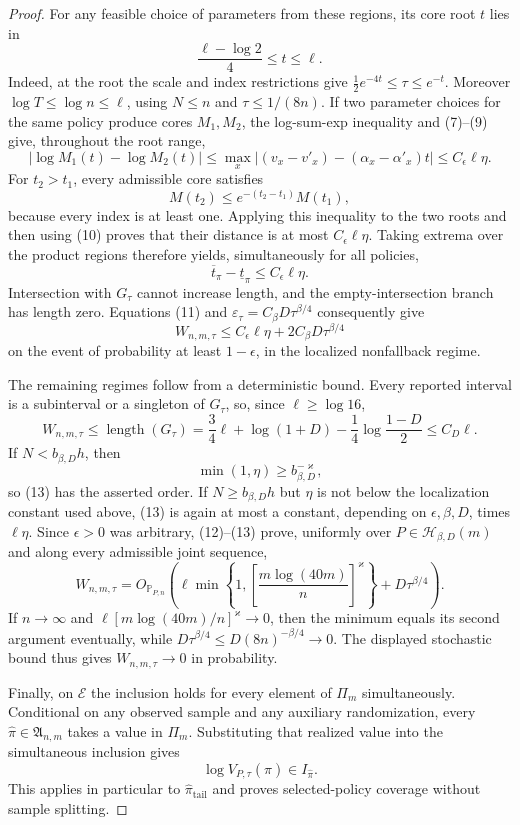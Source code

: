 \documentclass{article}
\begin{document}
\begin{proof}
For any feasible choice of parameters from these regions, its core root \(t\) lies in
\[
 \frac{\ell-\log2}{4}\leq t\leq\ell.
 \tag{9}
\]
Indeed, at the root the scale and index restrictions give
\(\tfrac12e^{-4t}\leq\tau\leq e^{-t}\).  Moreover
\(\log T\leq\log n\leq\ell\), using \(N\leq n\) and \(\tau\leq1/(8n)\).  If two parameter choices for the same policy produce cores \(M_1,M_2\), the log-sum-exp inequality and (7)--(9) give, throughout the root range,
\[
 |\log M_1(t)-\log M_2(t)|
 \leq\max_x\left|(v_x-v'_x)-(\alpha_x-\alpha'_x)t\right|
 \leq C_\epsilon\ell\eta.
 \tag{10}
\]
For \(t_2>t_1\), every admissible core satisfies
\[
 M(t_2)\leq e^{-(t_2-t_1)}M(t_1),
\]
because every index is at least one.  Applying this inequality to the two roots and then using (10) proves that their distance is at most \(C_\epsilon\ell\eta\).  Taking extrema over the product regions therefore yields, simultaneously for all policies,
\[
 \overline t_\pi-\underline t_\pi\leq C_\epsilon\ell\eta.
 \tag{11}
\]
Intersection with \(G_\tau\) cannot increase length, and the empty-intersection branch has length zero.  Equations (11) and \(\varepsilon_\tau=C_\beta D\tau^{\beta/4}\) consequently give
\[
 W_{n,m,\tau}
 \leq C_\epsilon\ell\eta+2C_\beta D\tau^{\beta/4}
 \tag{12}
\]
on the event of probability at least \(1-\epsilon\), in the localized nonfallback regime.

The remaining regimes follow from a deterministic bound.  Every reported interval is a subinterval or a singleton of \(G_\tau\), so, since \(\ell\geq\log16\),
\[
 W_{n,m,\tau}\leq\operatorname{length}(G_\tau)
 =\frac34\ell+\log(1+D)-\frac14\log\frac{1-D}{2}
 \leq C_D\ell.
 \tag{13}
\]
If \(N<b_{\beta,D}h\), then
\[
 \min(1,\eta)\geq b_{\beta,D}^{-\varkappa},
\]
so (13) has the asserted order.  If \(N\geq b_{\beta,D}h\) but \(\eta\) is not below the localization constant used above, (13) is again at most a constant, depending on \(\epsilon,\beta,D\), times \(\ell\eta\).  Since \(\epsilon>0\) was arbitrary, (12)--(13) prove, uniformly over \(P\in\mathcal H_{\beta,D}(m)\) and along every admissible joint sequence,
\[
 W_{n,m,\tau}
 =O_{\mathbb P_{P,n}}\!\left(
 \ell\min\left\{1,\left[\frac{m\log(40m)}n\right]^{\varkappa}\right\}
 +D\tau^{\beta/4}\right).
\]
If \(n\to\infty\) and \(\ell[m\log(40m)/n]^{\varkappa}\to0\), then the minimum equals its second argument eventually, while \(D\tau^{\beta/4}\leq D(8n)^{-\beta/4}\to0\).  The displayed stochastic bound thus gives \(W_{n,m,\tau}\to0\) in probability.

Finally, on \(\mathcal E\) the inclusion holds for every element of \(\Pi_m\) simultaneously.  Conditional on any observed sample and any auxiliary randomization, every \(\widehat\pi\in\mathfrak A_{n,m}\) takes a value in \(\Pi_m\).  Substituting that realized value into the simultaneous inclusion gives
\[
 \log V_{P,\tau}(\widehat\pi)\in I_{\widehat\pi}.
\]
This applies in particular to \(\widehat\pi_{\mathrm{tail}}\) and proves selected-policy coverage without sample splitting.
\end{proof}
\end{document}
